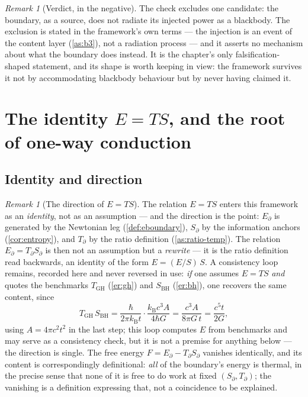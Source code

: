 \documentclass[11pt]{amsbook}
\theoremstyle{plain}
\theoremstyle{definition}
\theoremstyle{remark}
\newtheorem{remark}[theorem]{Remark}
\begin{document}
\begin{remark}[Verdict, in the negative]\label{rem:sb-verdict}
The check excludes one candidate: the boundary, as a source, does not radiate its injected power as a blackbody. The exclusion is stated in the framework's own terms --- the injection is an event of the content layer (\cref{as:b3}), not a radiation process --- and it asserts no mechanism about what the boundary does instead. It is the chapter's only falsification-shaped statement, and its shape is worth keeping in view: the framework survives it not by accommodating blackbody behaviour but by never having claimed it.
\end{remark}

\section{The identity \texorpdfstring{$E = TS$}{E = TS}, and the root of one-way conduction}\label{sec:identity-direction}

\subsection{Identity and direction}\label{sec:ets-direction}

\begin{remark}[The direction of \texorpdfstring{$E = TS$}{E = TS}]\label{rem:direction-ets}
The relation $E = TS$ enters this framework as an \emph{identity}, not as an assumption --- and the direction is the point: $E_{\partial}$ is generated by the Newtonian leg (\cref{def:eboundary}), $S_{\partial}$ by the information anchors (\cref{cor:entropy}), and $T_{\partial}$ by the ratio definition (\cref{as:ratio-temp}). The relation $E_{\partial} = T_{\partial}S_{\partial}$ is then not an assumption but a \emph{rewrite} --- it is the ratio definition read backwards, an identity of the form $E = (E/S)\,S$. A consistency loop remains, recorded here and never reversed in use: \emph{if} one assumes $E = TS$ \emph{and} quotes the benchmarks $T_{\mathrm{GH}}$ (\cref{er:gh}) and $S_{\mathrm{BH}}$ (\cref{er:bh}), one recovers the same content, since
\begin{equation}\label{eq:oldloop}
T_{\mathrm{GH}}\,S_{\mathrm{BH}} = \frac{\hbar}{2\pi k_{\mathrm B}t}\cdot\frac{k_{\mathrm B}c^{3}A}{4\hbar G} = \frac{c^{3}A}{8\pi G\,t} = \frac{c^{5}t}{2G},
\end{equation}
using $A = 4\pi c^{2}t^{2}$ in the last step; this loop computes $E$ from benchmarks and may serve as a consistency check, but it is not a premise for anything below --- the direction is single. The free energy $F = E_{\partial} - T_{\partial}S_{\partial}$ vanishes identically, and its content is correspondingly definitional: \emph{all} of the boundary's energy is thermal, in the precise sense that none of it is free to do work at fixed $(S_{\partial}, T_{\partial})$; the vanishing is a definition expressing that, not a coincidence to be explained.
\end{remark}
\end{document}
